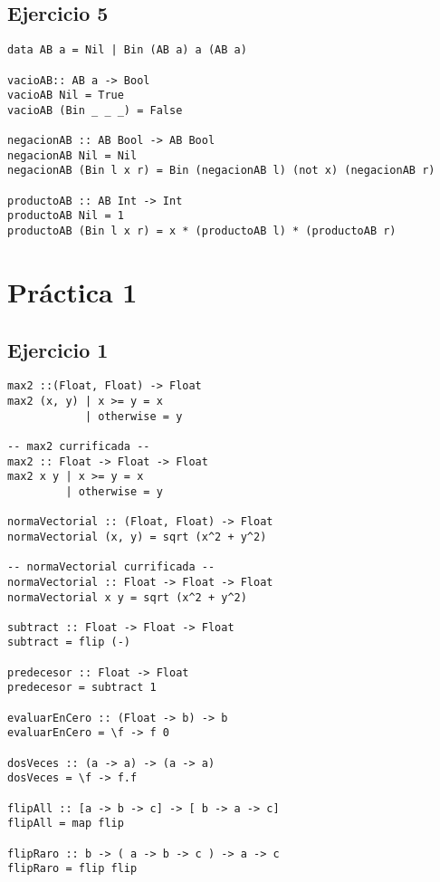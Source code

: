 \documentclass[10pt,a4paper]{article}
\begin{document}
\subsection{Ejercicio 5}
\begin{centrado}
\begin{verbatim}
data AB a = Nil | Bin (AB a) a (AB a)

vacioAB:: AB a -> Bool
vacioAB Nil = True
vacioAB (Bin _ _ _) = False

negacionAB :: AB Bool -> AB Bool
negacionAB Nil = Nil
negacionAB (Bin l x r) = Bin (negacionAB l) (not x) (negacionAB r)

productoAB :: AB Int -> Int
productoAB Nil = 1
productoAB (Bin l x r) = x * (productoAB l) * (productoAB r)
\end{verbatim}
\end{centrado}

\newpage
\section{Práctica 1}
\subsection{Ejercicio 1}
\begin{centrado}
\begin{verbatim}
max2 ::(Float, Float) -> Float
max2 (x, y) | x >= y = x        
            | otherwise = y

-- max2 currificada --
max2 :: Float -> Float -> Float
max2 x y | x >= y = x
         | otherwise = y

normaVectorial :: (Float, Float) -> Float
normaVectorial (x, y) = sqrt (x^2 + y^2)

-- normaVectorial currificada --
normaVectorial :: Float -> Float -> Float
normaVectorial x y = sqrt (x^2 + y^2)

subtract :: Float -> Float -> Float
subtract = flip (-)

predecesor :: Float -> Float
predecesor = subtract 1

evaluarEnCero :: (Float -> b) -> b
evaluarEnCero = \f -> f 0

dosVeces :: (a -> a) -> (a -> a)
dosVeces = \f -> f.f

flipAll :: [a -> b -> c] -> [ b -> a -> c]
flipAll = map flip

flipRaro :: b -> ( a -> b -> c ) -> a -> c
flipRaro = flip flip
\end{verbatim}
\end{centrado}
\end{document}
